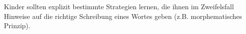 Kinder sollten explizit bestimmte Strategien lernen, die ihnen im Zweifelsfall Hinweise auf die richtige Schreibung eines Wortes geben (z.B. morphematisches Prinzip).